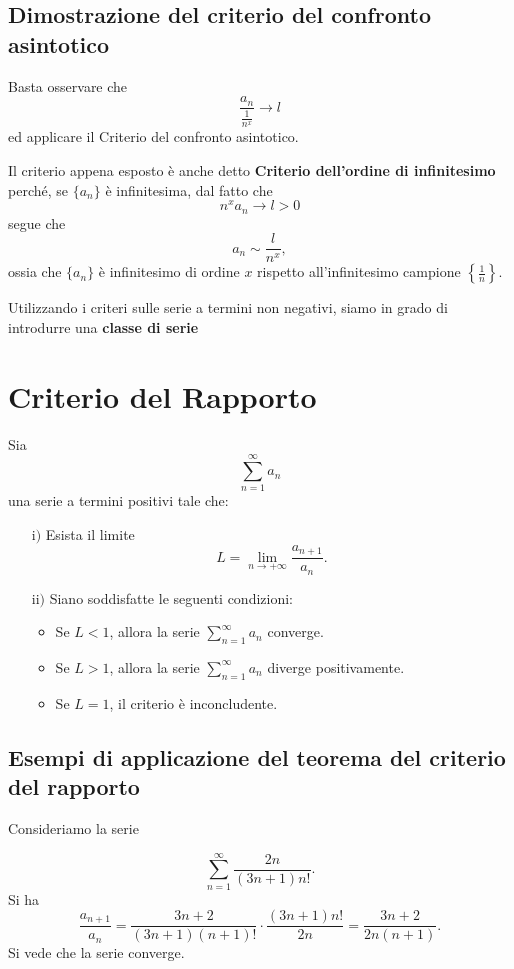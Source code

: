 \documentclass{article}
\begin{document}
 \subsection*{Dimostrazione del criterio del confronto asintotico}
Basta osservare che 
\[
\frac{a_n}{\frac{1}{n^x}} \to l
\]
ed applicare il Criterio del confronto asintotico.

Il criterio appena esposto è anche detto \textbf{Criterio dell'ordine di infinitesimo} perché, se \(\{a_n\}\) è infinitesima, dal fatto che 
\[
n^x a_n \to l > 0
\]
segue che 
\[
a_n \sim \frac{l}{n^x},
\]
ossia che \(\{a_n\}\) è infinitesimo di ordine \(x\) rispetto all'infinitesimo campione \(\left\{\frac{1}{n}\right\}\).

Utilizzando i criteri sulle serie a termini non negativi, siamo in grado di introdurre una \textbf{classe di serie} 

\section*{Criterio del Rapporto}
Sia 
\[
\sum_{n=1}^{\infty} a_n
\]
una serie a termini positivi tale che:

\begin{enumerate}
    \item[\( \text{i)} \)] Esista il limite 
    \[
    L = \lim_{n \to +\infty} \frac{a_{n+1}}{a_n}.
    \]

    \item[\( \text{ii)} \)] Siano soddisfatte le seguenti condizioni:
    \begin{itemize}
        \item Se \(L < 1\), allora la serie \(\sum_{n=1}^{\infty} a_n\) converge.
        \item Se \(L > 1\), allora la serie \(\sum_{n=1}^{\infty} a_n\) diverge positivamente.
        \item Se \(L = 1\), il criterio è inconcludente.
    \end{itemize}
\end{enumerate}
\subsection*{Esempi di applicazione del teorema del criterio del rapporto}
Consideriamo la serie

\[
\sum_{n=1}^{\infty} \frac{2n}{(3n+1)n!}.
\]
Si ha
\[
\frac{a_{n+1}}{a_n} = \frac{3n+2}{(3n+1)(n+1)!} \cdot \frac{(3n+1)n!}{2n} = \frac{3n+2}{2n(n+1)}.
\]
Si vede che la serie converge.
\end{document}
